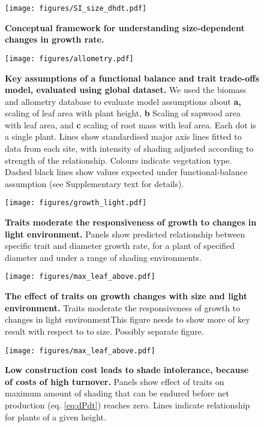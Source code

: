 \documentclass[12pt, a4paper]{article}
\makeatletter
\def\maxwidth{\ifdim\Gin@nat@width>\linewidth\linewidth
\else\Gin@nat@width\fi}
\let\Oldincludegraphics\includegraphics
\renewcommand{\includegraphics}[1]{\Oldincludegraphics[width=\maxwidth]{#1}}
\makeatother
\begin{document}
\newpage

\begin{figure}[htbp]
\centering
\texttt{[image: figures/SI\_size\_dhdt.pdf]}
\caption{\textbf{Conceptual framework for understanding size-dependent
changes in growth rate.} \label{f-conceptual}}
\end{figure}

\newpage

\begin{figure}[htbp]
\centering
\texttt{[image: figures/allometry.pdf]}
\caption{\textbf{Key assumptions of a functional balance and trait
trade-offs model, evaluated using global dataset.} We used the biomass and
allometry database to evaluate model assumptions about \textbf{a,}
scaling of leaf area with plant height, \textbf{b} Scaling of sapwood
area with leaf area, and \textbf{c} scaling of root mass with leaf area.
Each dot is a single plant. Lines show standardised major axis lines
fitted to data from each site, with intensity of shading adjusted
according to strength of the relationship. Colours indicate vegetation
type. Dashed black lines show values expected under functional-balance
assumption (see Supplementary text for details). \label{f-assumptions}}
\end{figure}

\newpage

\begin{figure}[htbp]
\centering
\texttt{[image: figures/growth\_light.pdf]}
\caption{\textbf{Traits moderate the responsiveness of growth to changes
in light environment.} Panels show predicted relationship between
specific trait and diameter growth rate, for a plant of specified
diameter and under a range of shading environments.
\label{f-growth_light}}
\end{figure}

\newpage

\begin{figure}[htbp]
\centering
\texttt{[image: figures/max\_leaf\_above.pdf]}
\caption{\textbf{The effect of traits on growth changes with size and
light environment.} Traits moderate the responsiveness of growth to changes in light
environmentThis figure needs to show more of key result with respect to to size.
Possibly separate figure. \label{f-shifts}}
\end{figure}

\newpage

\begin{figure}[htbp]
\centering
\texttt{[image: figures/max\_leaf\_above.pdf]}
\caption{\textbf{Low construction cost leads to shade intolerance,
because of costs of high turnover.} Panels show effect of traits on
maximum amount of shading that can be endured before net production (eq.
\ref{eq:dPdt}) reaches zero. Lines indicate relationship for plants of a
given height. \label{f-wplcp}}
\end{figure}
\end{document}
